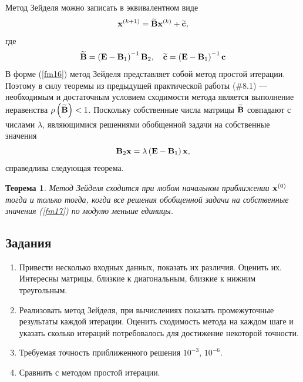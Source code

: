 \documentclass[12pt]{article}
\newtheorem{theorem}{Теорема}
\begin{document}
	Метод Зейделя можно записать в эквивалентном виде
	\begin{equation}
		\bold{x}^{\left(k+1\right)}=\widetilde{\bold{B}}\bold{x}^{\left(k\right)}+\widetilde{\bold{c}},
	\end{equation}
	где
	\begin{equation}
		\widetilde{\bold{B}}=\left(\bold{E}-\bold{B}_1\right)^{-1}\bold{B}_2,\quad \widetilde{\bold{c}}=\left(\bold{E}-\bold{B}_1\right)^{-1}\bold{c}\label{fm16}
	\end{equation}
	В форме (\ref{fm16}) метод Зейделя представляет собой метод простой итерации. Поэтому в силу теоремы из предыдущей практической работы (\#8.1) --- необходимым и достаточным условием сходимости метода является выполнение неравенства $\rho\left(\widetilde{\bold{B}}\right)<1$. Поскольку собственные числа матрицы
	$\widetilde{\bold{B}}$ совпадают с числами $\lambda$, являющимися решениями обобщенной задачи на собственные значения 
	\begin{equation}
	\bold{B}_2\bold{x}=\lambda\left(\bold{E}-\bold{B}_1\right)\bold{x},\label{fm17}
	\end{equation}
	справедлива следующая теорема.
	\begin{theorem}
		Метод Зейделя сходится при любом начальном приближении $\bold{x}^{\left(0\right)}$ тогда и только тогда, когда все решения обобщенной задачи на собственные значения (\ref{fm17}) по модулю меньше единицы.
	\end{theorem}
	
	\subsection*{Задания}
	
	\begin{enumerate}
		\item Привести несколько входных данных, показать их различия. Оценить их. Интересны матрицы, близкие к диагональным, близкие к нижним треугольным.
		\item Реализовать метод Зейделя, при вычислениях показать промежуточные результаты каждой итерации. Оценить сходимость метода на каждом шаге и указать сколько итераций потребовалось для достижение некоторой точности.
		\item Требуемая точность приближенного решения $10^{-3}$, $10^{-6}$.
		\item Сравнить с методом простой итерации.
	\end{enumerate}
\end{document}

